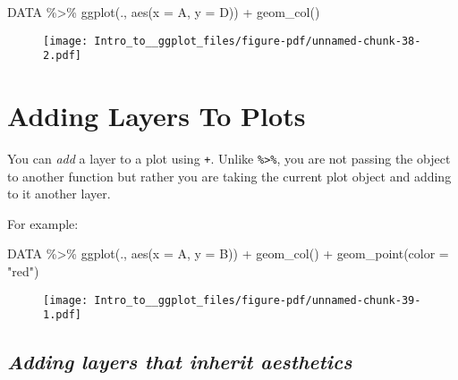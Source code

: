 \documentclass[
  letterpaper,
  DIV=11,
  numbers=noendperiod]{scrartcl}
\newenvironment{Shaded}{\begin{snugshade}}{\end{snugshade}}
\newcommand{\AttributeTok}[1]{\textcolor[rgb]{0.40,0.45,0.13}{#1}}
\newcommand{\FunctionTok}[1]{\textcolor[rgb]{0.28,0.35,0.67}{#1}}
\newcommand{\NormalTok}[1]{\textcolor[rgb]{0.00,0.23,0.31}{#1}}
\newcommand{\SpecialCharTok}[1]{\textcolor[rgb]{0.37,0.37,0.37}{#1}}
\newcommand{\StringTok}[1]{\textcolor[rgb]{0.13,0.47,0.30}{#1}}
\begin{document}
\begin{Shaded}
\begin{Highlighting}[]
\NormalTok{DATA }\SpecialCharTok{\%\textgreater{}\%}
  \FunctionTok{ggplot}\NormalTok{(., }\FunctionTok{aes}\NormalTok{(}\AttributeTok{x =}\NormalTok{ A, }\AttributeTok{y =}\NormalTok{ D)) }\SpecialCharTok{+} 
  \FunctionTok{geom\_col}\NormalTok{()}
\end{Highlighting}
\end{Shaded}

\begin{figure}[H]

{\centering \texttt{[image: Intro\_to\_\_ggplot\_files/figure-pdf/unnamed-chunk-38-2.pdf]}

}

\end{figure}

\hypertarget{adding-layers-to-plots}{%
\section{\texorpdfstring{\textbf{Adding Layers To
Plots}}{Adding Layers To Plots}}\label{adding-layers-to-plots}}

You can \emph{add} a layer to a plot using \texttt{+}. Unlike
\texttt{\%\textgreater{}\%}, you are not passing the object to another
function but rather you are taking the current plot object and adding to
it another layer.

For example:

\begin{Shaded}
\begin{Highlighting}[]
\NormalTok{DATA }\SpecialCharTok{\%\textgreater{}\%}
  \FunctionTok{ggplot}\NormalTok{(., }\FunctionTok{aes}\NormalTok{(}\AttributeTok{x =}\NormalTok{ A, }\AttributeTok{y =}\NormalTok{ B)) }\SpecialCharTok{+}
  \FunctionTok{geom\_col}\NormalTok{() }\SpecialCharTok{+} 
  \FunctionTok{geom\_point}\NormalTok{(}\AttributeTok{color =} \StringTok{"red"}\NormalTok{) }
\end{Highlighting}
\end{Shaded}

\begin{figure}[H]

{\centering \texttt{[image: Intro\_to\_\_ggplot\_files/figure-pdf/unnamed-chunk-39-1.pdf]}

}

\end{figure}

\hypertarget{adding-layers-that-inherit-aesthetics}{%
\subsection{\texorpdfstring{\emph{Adding layers that inherit
aesthetics}}{Adding layers that inherit aesthetics}}\label{adding-layers-that-inherit-aesthetics}}
\end{document}
